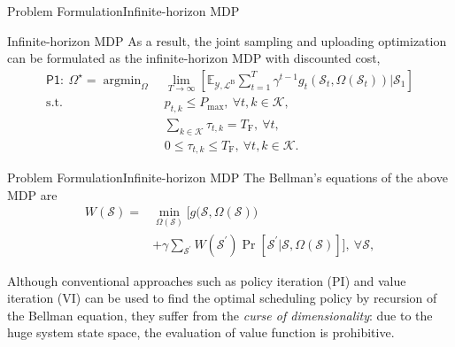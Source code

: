 \documentclass[aspectratio=169]{beamer}
\begin{document}
\begin{frame}{Problem Formulation}{Infinite-horizon MDP}
    \begin{block}{Infinite-horizon MDP}
        As a result, the joint sampling and uploading optimization can be formulated as the infinite-horizon MDP with discounted cost,
        \begin{align*}
            \mathsf{P1}:\
            \Omega^{\star}
            =
            \mathop{\arg\min}_{\Omega}\
            & \lim_{T\rightarrow\infty}\left[\mathbb{E}_{\mathcal{Y},\mathcal{L}^{\mathrm{B}}}\sum\nolimits_{t=1}^{T}\gamma^{t\!-\!1}g_{t}(\mathcal{S}_{t},\Omega(\mathcal{S}_{t}))\Big|\mathcal{S}_{1}\right]\nonumber                                                                        \\
            \mathrm{s.t.}\
            & p_{t,k}\leq P_{\mathrm{max}},\ \forall{t},{k}\in\mathcal{K},  \\
            & \sum\nolimits_{k\in\mathcal{K}}\tau_{t,k}=T_{\mathrm{F}},\ \forall{t}, \\
            & 0\leq\tau_{t,k}\leq T_{\mathrm{F}},\ \forall{t,k}\in\mathcal{K}.
        \end{align*}
    \end{block}
\end{frame}

\begin{frame}{Problem Formulation}{Infinite-horizon MDP}
    The Bellman's equations of the above MDP are
    \begin{align*}
        W(\mathcal{S})
        =
         &
        \textstyle{
        \min_{\Omega(\mathcal{S})}\big[g\big(\mathcal{S},\Omega(\mathcal{S})\big)
        }
        \nonumber
        \\
         &
        +
        \textstyle{
            \gamma\sum_{\mathcal{S}^{\prime}}W(\mathcal{S}^{\prime})\Pr[\mathcal{S}^{\prime}|\mathcal{S},\Omega(\mathcal{S})]\big],\
        }
        \forall\mathcal{S},
    \end{align*}

    Although conventional approaches such as policy iteration (PI) and value iteration (VI) can be used to find the optimal scheduling policy by recursion of the Bellman equation, they suffer from the \textit{curse of dimensionality}: due to the huge system state space, the evaluation of value function is prohibitive.
\end{frame}
\end{document}
